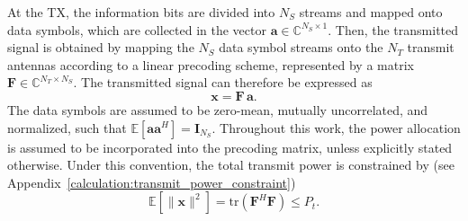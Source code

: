 At the \ac{TX}, the information bits are divided into $N_S$ streams and mapped onto data symbols, which are collected in the vector $\mathbf{a} \in \mathbb{C}^{N_S \times 1}$.
Then, the transmitted signal is obtained by mapping the $N_S$ data symbol streams onto the $N_T$ transmit antennas according to a linear precoding scheme, represented by a matrix $\mathbf{F} \in \mathbb{C}^{N_T \times N_S}$.
The transmitted signal can therefore be expressed as
\begin{equation}
\label{eq:su_mimo_precoding}
    \mathbf{x} = \mathbf{F} \, \mathbf{a}.
\end{equation}
The data symbols are assumed to be zero-mean, mutually uncorrelated, and normalized, such that $ \mathbb{E}\!\left[\mathbf{a}\mathbf{a}^H\right] = \mathbf{I}_{N_S} $.
Throughout this work, the power allocation is assumed to be incorporated into the precoding matrix, unless explicitly stated otherwise. Under this convention, the total transmit power is constrained by (see Appendix~\ref{calculation:transmit_power_constraint})
\begin{equation}
\label{eq:su_mimo_power_constraint}
    \mathbb{E}\!\left[\|\mathbf{x}\|^2\right] = \mathrm{tr}\!\left(\mathbf{F}^H \mathbf{F}\right) \leq P_t.
\end{equation}

